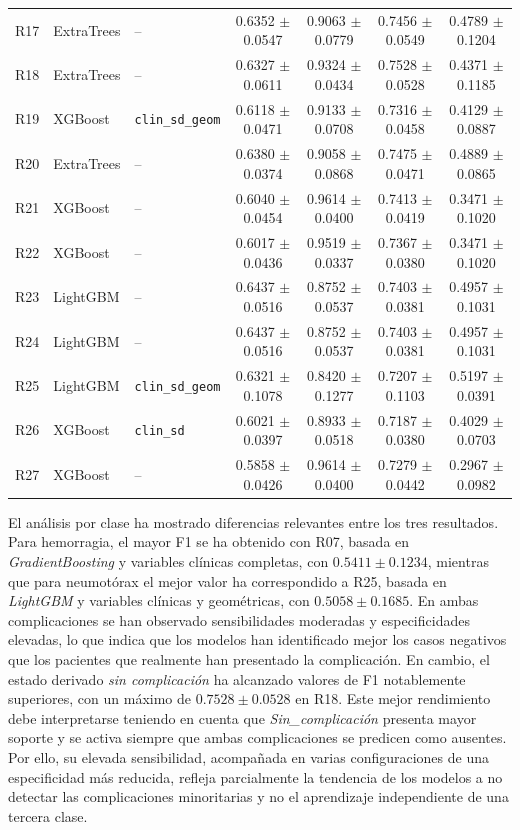 \begin{landscape}
\begin{longtable}{rllcccc}
R17 & ExtraTrees & -- & 0.6352 $\pm$ 0.0547 & 0.9063 $\pm$ 0.0779 & 0.7456 $\pm$ 0.0549 & 0.4789 $\pm$ 0.1204 \\
R18 & ExtraTrees & -- & 0.6327 $\pm$ 0.0611 & 0.9324 $\pm$ 0.0434 & 0.7528 $\pm$ 0.0528 & 0.4371 $\pm$ 0.1185 \\
R19 & XGBoost & \texttt{clin\_sd\_geom} & 0.6118 $\pm$ 0.0471 & 0.9133 $\pm$ 0.0708 & 0.7316 $\pm$ 0.0458 & 0.4129 $\pm$ 0.0887 \\
R20 & ExtraTrees & -- & 0.6380 $\pm$ 0.0374 & 0.9058 $\pm$ 0.0868 & 0.7475 $\pm$ 0.0471 & 0.4889 $\pm$ 0.0865 \\
R21 & XGBoost & -- & 0.6040 $\pm$ 0.0454 & 0.9614 $\pm$ 0.0400 & 0.7413 $\pm$ 0.0419 & 0.3471 $\pm$ 0.1020 \\
R22 & XGBoost & -- & 0.6017 $\pm$ 0.0436 & 0.9519 $\pm$ 0.0337 & 0.7367 $\pm$ 0.0380 & 0.3471 $\pm$ 0.1020 \\
R23 & LightGBM & -- & 0.6437 $\pm$ 0.0516 & 0.8752 $\pm$ 0.0537 & 0.7403 $\pm$ 0.0381 & 0.4957 $\pm$ 0.1031 \\
R24 & LightGBM & -- & 0.6437 $\pm$ 0.0516 & 0.8752 $\pm$ 0.0537 & 0.7403 $\pm$ 0.0381 & 0.4957 $\pm$ 0.1031 \\
R25 & LightGBM & \texttt{clin\_sd\_geom} & 0.6321 $\pm$ 0.1078 & 0.8420 $\pm$ 0.1277 & 0.7207 $\pm$ 0.1103 & 0.5197 $\pm$ 0.0391 \\
R26 & XGBoost & \texttt{clin\_sd} & 0.6021 $\pm$ 0.0397 & 0.8933 $\pm$ 0.0518 & 0.7187 $\pm$ 0.0380 & 0.4029 $\pm$ 0.0703 \\
R27 & XGBoost & -- & 0.5858 $\pm$ 0.0426 & 0.9614 $\pm$ 0.0400 & 0.7279 $\pm$ 0.0442 & 0.2967 $\pm$ 0.0982 \\
\end{longtable}
\endgroup
\end{landscape}

El análisis por clase ha mostrado diferencias relevantes entre los tres resultados. Para hemorragia, el mayor F1 se ha obtenido con R07, basada en \textit{GradientBoosting} y variables clínicas completas, con \(0.5411 \pm 0.1234\), mientras que para neumotórax el mejor valor ha correspondido a R25, basada en \textit{LightGBM} y variables clínicas y geométricas, con \(0.5058 \pm 0.1685\). En ambas complicaciones se han observado sensibilidades moderadas y especificidades elevadas, lo que indica que los modelos han identificado mejor los casos negativos que los pacientes que realmente han presentado la complicación. En cambio, el estado derivado \textit{sin complicación} ha alcanzado valores de F1 notablemente superiores, con un máximo de \(0.7528 \pm 0.0528\) en R18. Este mejor rendimiento debe interpretarse teniendo en cuenta que \textit{Sin\_complicación} presenta mayor soporte y se activa siempre que ambas complicaciones se predicen como ausentes. Por ello, su elevada sensibilidad, acompañada en varias configuraciones de una especificidad más reducida, refleja parcialmente la tendencia de los modelos a no detectar las complicaciones minoritarias y no el aprendizaje independiente de una tercera clase.
